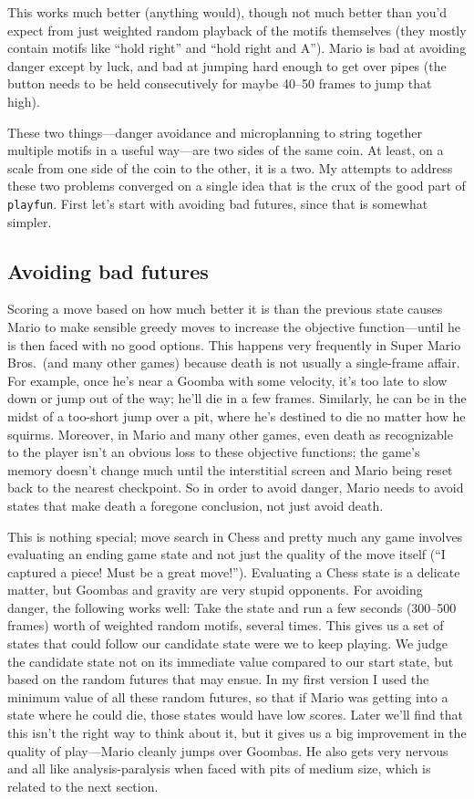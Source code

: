 \documentclass[twocolumn]{article}
\begin{document}
This works much better (anything would), though not much better than
you'd expect from just weighted random playback of the motifs
themselves (they mostly contain motifs like ``hold right'' and ``hold
right and A''). Mario is bad at avoiding danger except by luck, and
bad at jumping hard enough to get over pipes (the button needs to be
held consecutively for maybe 40--50 frames to jump that high).

These two things---danger avoidance and microplanning to string
together multiple motifs in a useful way---are two sides of the same
coin. At least, on a scale from one side of the coin to the other, it
is a two. My attempts to address these two problems converged on a
single idea that is the crux of the good part of {\tt playfun}. First
let's start with avoiding bad futures, since that is somewhat simpler.

\subsection{Avoiding bad futures}

Scoring a move based on how much better it is than the previous state
causes Mario to make sensible greedy moves to increase the objective
function---until he is then faced with no good options. This happens
very frequently in Super Mario Bros.~(and many other games) because
death is not usually a single-frame affair. For example, once he's
near a Goomba with some velocity, it's too late to slow down or jump
out of the way; he'll die in a few frames. Similarly, he can be in the
midst of a too-short jump over a pit, where he's destined to die no
matter how he squirms. Moreover, in Mario and many other games, even
death as recognizable to the player isn't an obvious loss to these
objective functions; the game's memory doesn't change much until the
interstitial screen and Mario being reset back to the nearest
checkpoint. So in order to avoid danger, Mario needs to avoid states
that make death a foregone conclusion, not just avoid death.

This is nothing special; move search in Chess and pretty much any game
involves evaluating an ending game state and not just the quality of
the move itself (``I captured a piece! Must be a great move!'').
Evaluating a Chess state is a delicate matter, but Goombas and gravity
are very stupid opponents. For avoiding danger, the following works
well: Take the state and run a few seconds (300--500 frames) worth of
weighted random motifs, several times. This gives us a set of states
that could follow our candidate state were we to keep playing. We
judge the candidate state not on its immediate value compared to our
start state, but based on the random futures that may ensue. In my
first version I used the minimum value of all these random futures, so
that if Mario was getting into a state where he could die, those
states would have low scores. Later we'll find that this isn't the
right way to think about it, but it gives us a big improvement in the
quality of play---Mario cleanly jumps over Goombas. He also gets very
nervous and all like analysis-paralysis when faced with pits of medium
size, which is related to the next section. %
\end{document}
